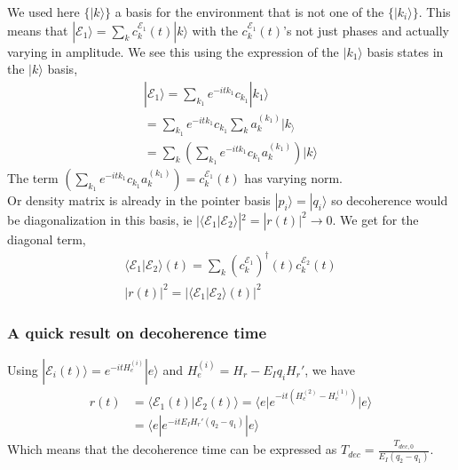 \documentclass{article}
\begin{document}
We used here $\{|k\rangle\}$ a basis for the environment that is not one of the $\{|k_i\rangle\}$. This means that $|\mathcal{E}_1\rangle=\sum_kc^{\mathcal{E}_1}_k(t)|k\rangle$ with the $c^{\mathcal{E}_1}_k(t)$'s not just phases and actually varying in amplitude. We see this using the expression of the $|k_1\rangle$ basis states in the $|k\rangle$ basis,
\begin{align}
    |\mathcal{E}_1\rangle=\sum_{k_1}e^{-itk_1}c_{k_1}|k_1\rangle\\
    =\sum_{k_1}e^{-itk_1}c_{k_1}\sum_ka^{(k_1)}_k|k_\rangle\\
    =\sum_k(\sum_{k_1}e^{-itk_1}c_{k_1}a^{(k_1)}_k)|k\rangle
\end{align}
The term $(\sum_{k_1}e^{-itk_1}c_{k_1}a^{(k_1)}_k)=c^{\mathcal{E}_1}_k(t)$ has varying norm. \\

Or density matrix is already in the pointer basis $|p_i\rangle=|q_i\rangle$ so decoherence would be diagonalization in this basis, ie $|\langle\mathcal{E}_1|\mathcal{E}_2\rangle|^2=|r(t)|^2\rightarrow0$. We get for the diagonal term,
\begin{align}
    \langle \mathcal{E}_1| \mathcal{E}_2\rangle(t) = \sum_k(c^{\mathcal{E}_1}_k)^{\dagger}(t)c^{\mathcal{E}_2}_k(t)\\
    |r(t)|^2=|\langle \mathcal{E}_1| \mathcal{E}_2\rangle(t)|^2
\end{align}

\subsubsection{A quick result on decoherence time}
Using $|\mathcal{E}_i(t)\rangle = e^{-itH^{(i)}_e}|e\rangle$ and $H^{(i)}_e=H_r-E_Iq_iH_r'$, we have
\begin{align}
    r(t)&=\langle\mathcal{E}_1(t)|\mathcal{E}_2(t)\rangle=\langle e|e^{-it(H^{(2)}_e-H^{(1)}_e)}|e\rangle\\
    &=\langle e|e^{-itE_IH_r'(q_2-q_1)} |e\rangle
\end{align}
Which means that the decoherence time can be expressed as $T_{dec} = \frac{T_{dec,0}}{E_I(q_2-q_1)}$.
\end{document}

